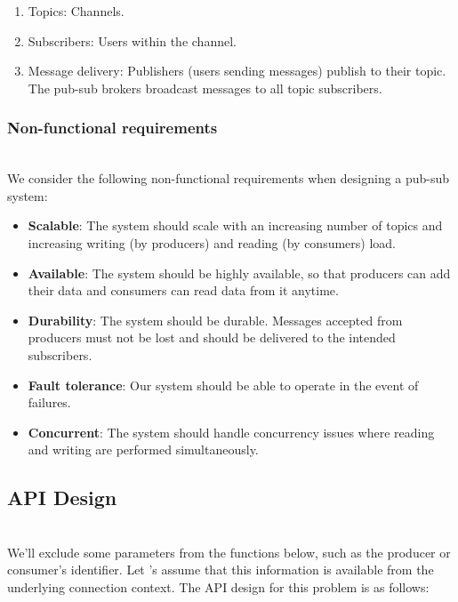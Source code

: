 \begin{enumerate}
\def\labelenumi{\arabic{enumi}.}
\tightlist
\item
Topics: Channels.
\item
Subscribers: Users within the channel.
\item
Message delivery: Publishers (users sending messages) publish to their topic. The pub-sub brokers broadcast messages to all topic subscribers.
\end{enumerate}

\subsubsection{Non-functional requirements}\label{MS0cp2MxXhT_-yMhOTnKw}
\\
We consider the following non-functional requirements when designing a pub-sub system:

\begin{itemize}
\item
\protect{}\label{0uO49KA5R7nz6TzuAIQo_}
\textbf{Scalable}: The system should scale with an increasing number of topics and increasing writing (by producers) and reading (by consumers) load.
\item
\protect{}\label{pIh8croBsYd99oLavZAGO}
\textbf{Available}: The system should be highly available, so that producers can add their data and consumers can read data from it anytime.
\item
\protect{}\label{P2UeIW3fcwFrgFLuAZcGe}
\textbf{Durability}: The system should be durable. Messages accepted from producers must not be lost and should be delivered to the intended subscribers.
\item
\protect{}\label{3GKYTqMJBUj0Y98x5BTcD}
\textbf{Fault tolerance}: Our system should be able to operate in the event of failures.
\item
\protect{}\label{Fm6_Qr49YGa2atoh2jZvD}
\textbf{Concurrent}: The system should handle concurrency issues where reading and writing are performed simultaneously.
\end{itemize}

\subsection{API Design}\label{Sdd1SF3wedDpbMekDeBq1}
\\
We'll exclude some parameters from the functions below, such as the producer or consumer's identifier. Let 's assume that this information is available from the underlying connection context. The
API design for this problem is as follows:

